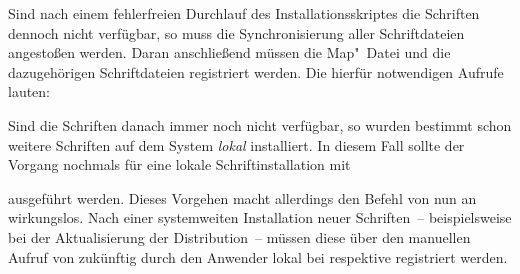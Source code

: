 Sind nach einem fehlerfreien Durchlauf des Installationsskriptes die Schriften 
dennoch nicht verfügbar, so muss die Synchronisierung aller Schriftdateien 
angestoßen werden. Daran anschließend müssen die Map"~Datei und die 
dazugehörigen Schriftdateien registriert werden. Die hierfür notwendigen 
Aufrufe lauten:
%
\begin{quoting}
\newline
{}\newline
{}
\end{quoting}
%
Sind die Schriften danach immer noch nicht verfügbar, so wurden bestimmt schon 
weitere Schriften auf dem System \emph{lokal} installiert. In diesem Fall 
sollte der Vorgang nochmals für eine lokale Schriftinstallation mit 
%
\begin{quoting}
\newline
{}\newline
{}
\end{quoting}
%
ausgeführt werden. Dieses Vorgehen macht allerdings den Befehl 
 von nun an wirkungslos. Nach einer systemweiten Installation 
neuer Schriften~-- beispielsweise bei der Aktualisierung der Distribution~-- 
müssen diese über den manuellen Aufruf von  zukünftig durch den 
Anwender lokal bei  respektive 
 registriert werden.




